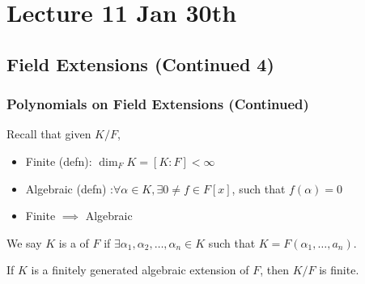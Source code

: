 \documentclass[notoc,notitlepage,nobib]{tufte-book}
\begin{document}



\chapter{Lecture 11 Jan 30th}%
\label{chp:lecture_11_jan_30th}

\section{Field Extensions (Continued 4)}%
\label{sec:field_extensions_continued_4}

\subsection{Polynomials on Field Extensions (Continued)}%
\label{sub:polynomials_on_field_extensions_continued}

\begin{note}
  Recall that given $K / F$,
  \begin{itemize}
    \item Finite (defn): $\dim_F K = [ K : F ] < \infty$
    \item Algebraic (defn) :$\forall \alpha \in K, \exists 0 \neq f \in F[x]$, such that
      $f(\alpha) = 0$
    \item Finite $\implies$ Algebraic
  \end{itemize}
\end{note}

\begin{defn}\label{defn:finitely_generated_extension}
  We say $K$ is a  of $F$ if $\exists \alpha_1,
  \alpha_2, \ldots, \alpha_n \in K$ such that $K = F(\alpha_1, \ldots, a_n)$.
\end{defn}

\begin{propo}\label{propo:finitely_generated_algebraic_extensions_are_finite}
  If $K$ is a finitely generated algebraic extension of $F$, then $K / F$ is finite.
\end{propo}
\end{document}
